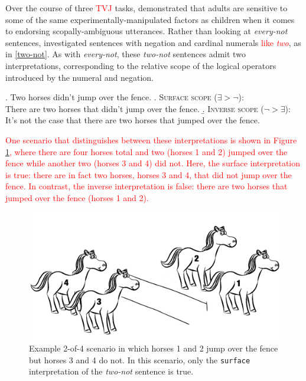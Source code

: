 \documentclass[preprint,authoryear]{elsarticle}\frenchspacing
\newcommand{\lp}[1]{\textcolor{red}{#1}} %
\begin{document}
Over the course of three 
\lp{TVJ}
tasks, \citet{musolinolidz2003} demonstrated that adults are sensitive to some of the same experimentally-manipulated factors as children when it comes to endorsing scopally-ambiguous utterances. Rather than looking at \emph{every-not} sentences, \citeauthor{musolinolidz2003} investigated sentences with negation and cardinal numerals \lp{like \textit{two}}, as in \ref{two-not}. As with \emph{every-not}, these \emph{two-not} sentences admit two interpretations, corresponding to the relative scope of the logical operators introduced by the numeral and negation.

\ex. \label{two-not}
Two horses didn't jump over the fence.
\a. \textsc{Surface scope} ($\exists > \neg$):\\
There are two horses that didn't jump over the fence.
\b. \textsc{Inverse scope} ($\neg > \exists$):\\
It's not the case that there are two horses that jumped over the fence.

\lp{One scenario that distinguishes between these interpretations is shown in Figure \ref{2-of-4}, where there are four horses total and two (horses 1 and 2) jumped over the fence while another two (horses 3 and 4) did not.
Here, the {surface} interpretation is true: there are in fact two horses, horses 3 and 4, that did not jump over the fence.
In contrast, the {inverse} interpretation is false: there are two horses that jumped over the fence (horses 1 and 2).}

\begin{figure}
    \centering
    \includegraphics[width=4.5in]{2-of-4.png}
    \caption{Example 2-of-4 scenario in which horses 1 and 2 jump over the fence but horses 3 and 4 do not. In this scenario, only the \texttt{surface} interpretation of the \emph{two-not} sentence is true.}
    \label{2-of-4}
\end{figure}
\end{document}
